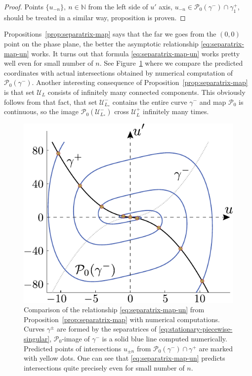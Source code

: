 \begin{proof}
	Points $\{ u_{-n} \} , \ n \in \mathbb{N}$ from the left side of $u'$ axis, $u_{-n} \in \mathcal{P}_0(\gamma^-) \cap \gamma_1^+$, should be treated in a similar way, proposition is proven.
\end{proof}

Propositions~\ref{prop:separatrix-map} says that the far we goes from the $(0, 0)$ point on the phase plane, the better the asymptotic relationship \eqref{eq:separatrix-map-un} works.
It turns out that formula \eqref{eq:separatrix-map-un} works pretty well even for small number of $n$.
See Figure~\ref{fig:separatrix-map-with-numerical-computations} where we compare the predicted coordinates with actual intersections obtained by numerical computation of $\mathcal{P}_0(\gamma^-)$.
Another interesting consequence of Proposition~\ref{prop:separatrix-map} is that set $\mathscr{U}_{L}$ consists of infinitely many connected components.
This obviously follows from that fact, that set $\mathscr{U}_{L_*}^-$ contains the entire curve $\gamma^-$ and map $\mathcal{P}_0$ is continuous, so the image $\mathcal{P}_0 (\mathscr{U}_{L_*}^-)$ cross $\mathscr{U}_{L}^+$ infinitely many times.
\begin{figure}[h]
\centering
	\includegraphics[scale = 1]{pic/separatrix map with numerical computations}
	\caption{
		Comparison of the relationship \eqref{eq:separatrix-map-un} from Proposition~\ref{prop:separatrix-map} with numerical computations.
		Curves $\gamma^{\pm}$ are formed by the separatrices of \eqref{eq:stationary-piecewise-singular}, $\mathcal{P}_0$-image of $\gamma^-$ is a solid blue line computed numerically.
		Predicted points of intersections $u_{\pm n}$ from $\mathcal{P}_0(\gamma^-) \cap \gamma^+$ are marked with yellow dots. One can see that \eqref{eq:separatrix-map-un} predicts intersections quite precisely even for small number of $n$.
	}
\label{fig:separatrix-map-with-numerical-computations}
\end{figure}

